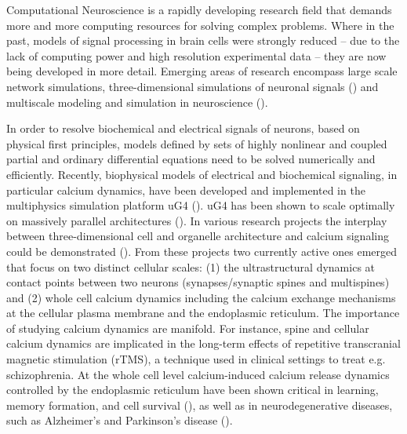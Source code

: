 Computational Neuroscience is a rapidly developing research field that demands more and more computing resources for solving complex problems. Where in the past, models of signal processing in brain cells were strongly reduced -- due to the lack of computing power and high resolution experimental data -- they are now being developed in more detail. Emerging areas of research encompass large scale network simulations, three-dimensional simulations of neuronal signals (\cite{Xylouris2007, Xylouris2012, Breit2016, Breit2018, Breit2018b}) and multiscale modeling and simulation in neuroscience (\cite{Stepniewski2019b}).

In order to resolve biochemical and electrical signals of neurons, based on physical first principles, models defined by sets of highly nonlinear and coupled partial and ordinary differential equations need to be solved numerically and efficiently. Recently, biophysical models of electrical and biochemical signaling, in particular calcium dynamics, have been developed and implemented in the multiphysics simulation platform uG4 (\cite{Vogel2013}). uG4 has been shown to scale optimally on massively parallel architectures (\cite{Reiter12}). In various research projects the interplay between three-dimensional cell and organelle architecture and calcium signaling could be demonstrated (\cite{Grein14, Wittmann2009, Queisser11, Knodel2014, Breit2018, Breit2018b}). From these projects two currently active ones emerged that focus on two distinct cellular scales: (1) the ultrastructural dynamics at contact points between two neurons (synapses/synaptic spines {\color{red} and multispines}) and (2) whole cell calcium dynamics including the calcium exchange mechanisms at the cellular plasma membrane and the endoplasmic reticulum. The importance of studying calcium dynamics are manifold. For instance, spine and cellular calcium dynamics are implicated in the long-term effects of repetitive transcranial magnetic stimulation (rTMS), a technique used in clinical settings to treat e.g. schizophrenia. At the whole cell level calcium-induced calcium release dynamics controlled by the endoplasmic reticulum have been shown critical in learning, memory formation, and cell survival (\cite{West2002, Milner1998, Bading2000, Hardingham1997}), as well as in neurodegenerative diseases, such as Alzheimer's and Parkinson's disease (\cite{Bezprozvanny2009, Chan2009, Cheung2008, Green2008}). 

